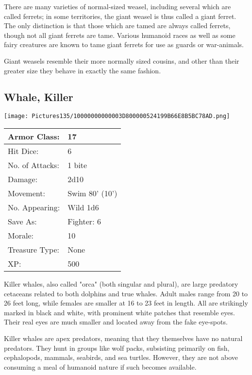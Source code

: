\documentclass[a4paper,twoside,openany,10pt]{book}
\begin{document}
\begin{multicols}{2}
There are many varieties of normal-sized weasel, including several which are called ferrets; in some territories, the giant weasel is thus called a giant ferret. The only distinction is that those which are tamed are always called ferrets, though not all giant ferrets are tame. Various humanoid races as well as some fairy creatures are known to tame giant ferrets for use as guards or war-animals.

Giant weasels resemble their more normally sized cousins, and other than their greater size they behave in exactly the same fashion.

\subsection*{Whale, Killer}\label{whale-killer}



\begin{center} \texttt{[image: Pictures135/10000000000003D800000524199B66E8B5BC78AD.png]} \end{center}


\begin{tabularx}{0.50\textwidth}{@{}lX@{}}
Armor Class: & 17 \\\hline
Hit Dice: & 6 \\\hline
No. of Attacks: & 1 bite \\\hline
Damage: & 2d10 \\\hline
Movement: & Swim 80' (10') \\\hline
No. Appearing: & Wild 1d6 \\\hline
Save As: & Fighter: 6 \\\hline
Morale: & 10 \\\hline
Treasure Type: & None \\\hline
XP: & 500 \\\hline
\end{tabularx}


Killer whales, also called "orca" (both singular and plural), are large predatory cetaceans related to both dolphins and true whales. Adult males range from 20 to 26 feet long, while females are smaller at 16 to 23 feet in length. All are strikingly marked in black and white, with prominent white patches that resemble eyes. Their real eyes are much smaller and located away from the fake eye-spots.

Killer whales are apex predators, meaning that they themselves have no natural predators. They hunt in groups like wolf packs, subsisting primarily on fish, cephalopods, mammals, seabirds, and sea turtles. However, they are not above consuming a meal of humanoid nature if such becomes available. 



\end{multicols}
\end{document}
